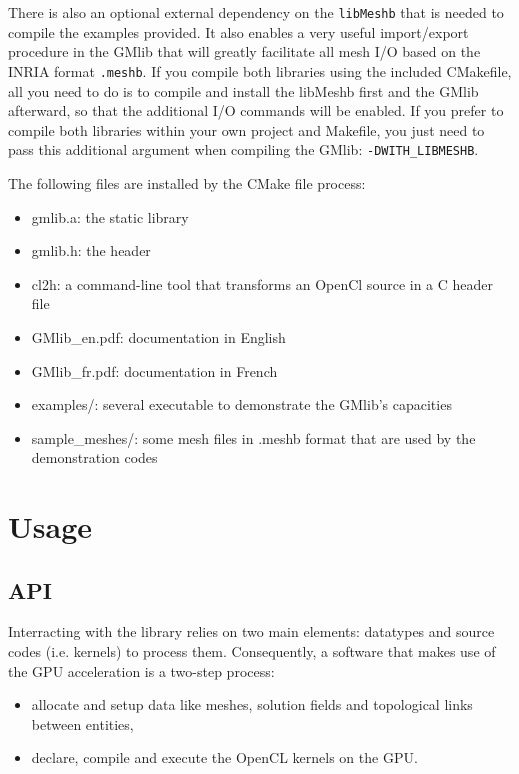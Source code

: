 \documentclass[a4paper,12pt]{article}
\begin{document}
There is also an optional external dependency on the {\tt libMeshb} that is needed to compile the examples provided.
It also enables a very useful import/export procedure in the GMlib that will greatly facilitate all mesh I/O based on the INRIA format {\tt *.meshb}.
If you compile both libraries using the included CMakefile, all you need to do is to compile and install the libMeshb first and the GMlib afterward, so that the additional I/O commands will be enabled.
If you prefer to compile both libraries within your own project and Makefile, you just need to pass this additional argument when compiling the GMlib: {\tt -DWITH\_LIBMESHB}.
\medskip

The following files are installed by the CMake file process:

\begin{itemize}
   \item gmlib.a: the static library
   \item gmlib.h: the header
   \item cl2h: a command-line tool that transforms an OpenCl source in a C header file
   \item GMlib\_en.pdf: documentation in English
   \item GMlib\_fr.pdf: documentation in French
   \item examples/: several executable to demonstrate the GMlib's capacities
   \item sample\_meshes/: some mesh files in .meshb format that are used by the demonstration codes
\end{itemize}


%
%

\section{Usage}

\subsection{API}
\label{sec:API}
Interracting with the library relies on two main elements: datatypes and source codes (i.e. kernels) to process them. Consequently, a software that makes use of the GPU acceleration is a two-step process:
\medskip

\begin{itemize}
\item allocate and setup data like meshes, solution fields and topological links between entities,
\item declare, compile and execute the OpenCL kernels on the GPU.
\end{itemize}
\medskip
\end{document}

